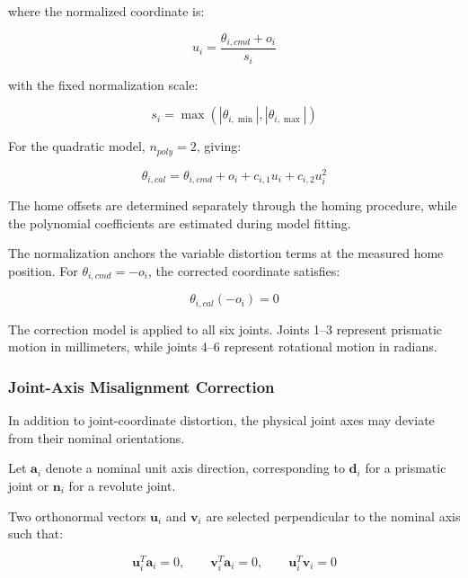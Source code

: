 \documentclass[11pt,letterpaper]{article}
\begin{document}
where the normalized coordinate is:

\begin{equation}
\boxed{
u_i=
\frac{\theta_{i,cmd}+o_i}{s_i}
}
\end{equation}

with the fixed normalization scale:

\begin{equation}
s_i=
\max\left(
|\theta_{i,\min}|,
|\theta_{i,\max}|
\right)
\end{equation}

For the quadratic model, $n_{poly}=2$, giving:

\begin{equation}
\boxed{
\theta_{i,cal}
=
\theta_{i,cmd}
+
o_i
+
c_{i,1}u_i
+
c_{i,2}u_i^2
}
\end{equation}

The home offsets are determined separately through
the homing procedure, while the polynomial coefficients
are estimated during model fitting.

The normalization anchors the variable distortion terms
at the measured home position. For
$\theta_{i,cmd}=-o_i$, the corrected coordinate satisfies:

\begin{equation}
\theta_{i,cal}(-o_i)=0
\end{equation}

The correction model is applied to all six joints.
Joints 1--3 represent prismatic motion in millimeters,
while joints 4--6 represent rotational motion in radians.


\subsubsection{Joint-Axis Misalignment Correction}

In addition to joint-coordinate distortion, the physical
joint axes may deviate from their nominal orientations.

Let $\mathbf{a}_i$ denote a nominal unit axis direction,
corresponding to $\mathbf{d}_i$ for a prismatic joint
or $\mathbf{n}_i$ for a revolute joint.

Two orthonormal vectors $\mathbf{u}_i$ and
$\mathbf{v}_i$ are selected perpendicular to
the nominal axis such that:

\begin{equation}
\mathbf{u}_i^T\mathbf{a}_i=0,
\qquad
\mathbf{v}_i^T\mathbf{a}_i=0,
\qquad
\mathbf{u}_i^T\mathbf{v}_i=0
\end{equation}
\end{document}
